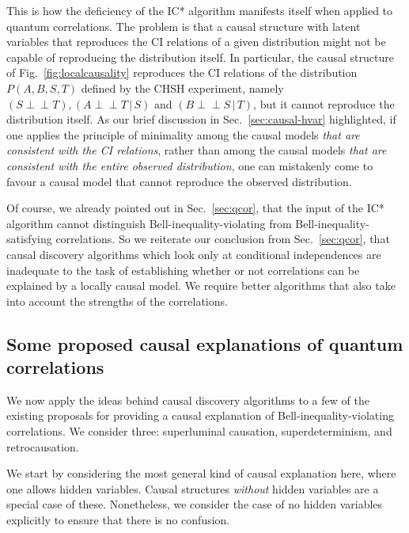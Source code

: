 \documentclass[letterpaper,onecolumn,nofootinbib]{revtex4}
\def\indep{\perp\!\!\!\!\perp}
\begin{document}
This is how the deficiency of the IC* algorithm manifests itself when applied to quantum correlations.    The problem is that a causal structure with latent variables that reproduces the CI relations of a given distribution might not be capable of reproducing the distribution itself.  In particular, the causal structure of Fig.~\ref{fig:localcausality} reproduces the CI relations of the distribution $P(A,B,S,T)$ defined by the CHSH experiment, namely $\left( S\indep T\right) ,\left( A\indep T\,|\,S\right)$ and $\left( B\indep S\,|\,T\right)$, but it cannot reproduce the distribution itself.  
As our brief discussion in Sec.~\ref{sec:causal-hvar} highlighted, if one applies the principle of minimality among the causal models {\em that are consistent with the CI relations}, rather than among the causal models {\em that are consistent with the entire observed distribution}, one can mistakenly come to favour a causal model that cannot reproduce the observed distribution.


Of course, we already pointed out in Sec.~\ref{sec:qcor}, that the input of the IC*
algorithm cannot distinguish Bell-inequality-violating from
Bell-inequality-satisfying correlations.  
So we reiterate our conclusion from Sec.~\ref{sec:qcor}, that causal discovery
algorithms which look only at conditional independences are inadequate to the task of
establishing whether or not correlations can be explained by a locally
causal model. We require better algorithms that also take into account the strengths of the correlations.



\subsection{Some proposed causal explanations of quantum correlations}

We now apply the ideas behind causal discovery algorithms to a few of the existing proposals for providing a causal explanation of Bell-inequality-violating correlations.  We consider three: superluminal causation, superdeterminism, and retrocausation.

We start by considering the most general kind of causal explanation here, where one allows hidden variables.  Causal structures \emph{without} hidden variables are a special case of these. Nonetheless, we consider the case of no hidden variables explicitly to ensure that there is no confusion. 
\end{document}
